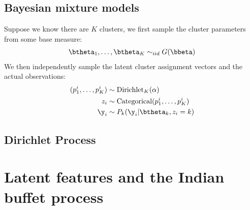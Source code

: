 \documentclass{article}
\begin{document}
\subsection{Bayesian mixture models}
Suppose we know there are $K$ clusters, we first sample the cluster parameters from some base measure:
\begin{align}
\btheta_1, \dots, \btheta_K \sim_{iid} G(\bbeta)
\end{align}
We then independently sample the latent cluster assignment vectors and the actual observations:
\begin{align}
(p_1^i, \dots, p_K^i) &\sim \text{Dirichlet}_K(\alpha)\\
z_i &\sim \text{Categorical}(p_1^i, \dots, p_K^i)\\
\y_i &\sim P_k(\y_i | \btheta_k, z_i = k)
\end{align}

\subsection{Dirichlet Process}




\section{Latent features and the Indian buffet process}
\end{document}
